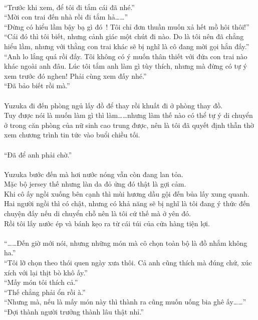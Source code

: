 \documentclass[12pt,a4paper, twosides]{book}
\begin{document}
\\
“Trước khi xem, để tôi đi tắm cái đã nhé.”\\
“Mời con trai đến nhà rồi đi tắm hả……”\\
“Đừng có hiểu lầm bậy bạ gì đó~! Tôi chỉ đơn thuần muốn xả hết mồ hôi thôi!”\\
“Cái đó thì tôi biết, nhưng cảnh giác một chút đi nào. Do là tôi nên đã chẳng hiểu lầm, nhưng với thằng con trai khác sẽ bị nghĩ là cô đang mời gọi hắn đấy.”\\
“Anh lo lắng quá rồi đấy. Tôi không có ý muốn thân thiết với đứa con trai nào khác ngoài anh đâu. Lúc tôi tắm anh làm gì tùy thích, nhưng mà đừng có tự ý xem trước đó nghen! Phải cùng xem đấy nhé.”\\
“Đã bảo biết rồi mà.”\\
\\
Yuzuka đi đến phòng ngủ lấy đồ để thay rồi khuất đi ở phòng thay đồ.\\
Tuy được nói là muốn làm gì thì làm……nhưng làm thế nào có thể tự ý di chuyển ở trong căn phòng của nữ sinh cao trung được, nên là tôi đã quyết định thẫn thờ xem chương trình tin tức vào buổi chiều tối.\\
\\
“Đã để anh phải chờ.”\\
\\
Yuzuka bước đến mà hơi nước nóng vẫn còn đang lan tỏa.\\
Mặc bộ jersey thế nhưng làn da đỏ ửng đó thật là gợi cảm.\\
Khi cô ấy ngồi xuống bên cạnh thì mùi hương dầu gội đến bủa lấy xung quanh.\\
Hai người ngồi thì có chật, nhưng có khả năng sẽ bị nghĩ là tôi đang ý thức đến chuyện đấy nếu di chuyển chỗ nên là tôi cứ thế mà ở yên đó.\\
Rồi tôi lấy nước ép và bánh kẹo ra từ cái túi của cửa hàng tiện lợi.\\
\\
“……Đến giờ mới nói, nhưng những món mà cô chọn toàn bộ là đồ nhắm không ha.”\\
“Tôi lỡ chọn theo thói quen ngày xưa thôi. Cả anh cũng thích mà đúng chứ, xúc xích với lại thịt bò khô ấy.”\\
“Mấy món tôi thích cả.”\\
“Thế chẳng phải ổn rồi à.”\\
“Nhưng mà, nếu là mấy món này thì thành ra cũng muốn uống bia ghê ấy……”\\
“Đợi thành người trưởng thành lâu thật nhỉ.”\\
\end{document}
